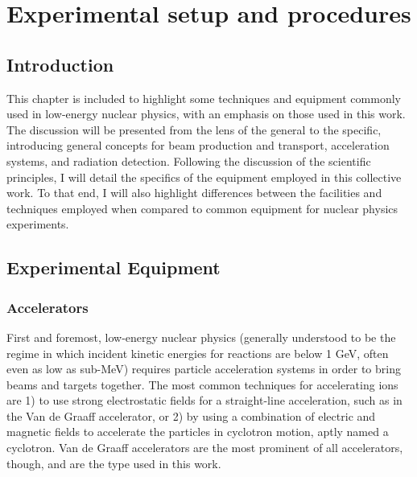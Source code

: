 %
%
%
%
%
%
%
%
%
%

%
%

\chapter{Experimental setup and procedures}
\label{chap: experiment}

\section{Introduction}

This chapter is included to highlight some techniques and equipment commonly used in low-energy nuclear physics, with an emphasis on those used in this work. The discussion will be presented from the lens of the general to the specific, introducing general concepts for beam production and transport, acceleration systems, and radiation detection. Following the discussion of the scientific principles, I will detail the specifics of the equipment employed in this collective work. To that end, I will also highlight differences between the facilities and techniques employed when compared to common equipment for nuclear physics experiments.


\section{Experimental Equipment}
\label{sec: equipment}



\subsection{Accelerators}
\label{sec: accelerators}

First and foremost, low-energy nuclear physics (generally understood to be the regime in which incident kinetic energies for reactions are below 1 GeV, often even as low as sub-MeV) requires particle acceleration systems in order to bring beams and targets together. The most common techniques for accelerating ions are 1) to use strong electrostatic fields for a straight-line acceleration, such as in the Van de Graaff accelerator, or 2)  by using a combination of electric and magnetic fields to accelerate the particles in cyclotron motion, aptly named a cyclotron. Van de Graaff accelerators are the most prominent of all accelerators, though, and are the type used in this work. 


